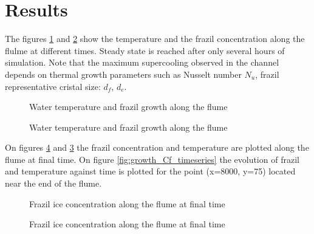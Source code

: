 \section{Results}
The figures \ref{fig:growth_temp} and \ref{fig:growth_Cf} show the temperature and the frazil concentration along the flulme at different times. Steady state is reached after only several hours of simulation. Note that the maximum supercooling observed in the channel depends on thermal growth parameters such as Nusselt number $N_u$, frazil representative cristal size: $d_f$, $d_e$.
\begin{figure}[H]
    \begin{center}
    \end{center}
    \caption{Water temperature and frazil growth along the flume}
    \label{fig:growth_temp}
\end{figure}

\begin{figure}[H]
    \begin{center}
    \end{center}
    \caption{Water temperature and frazil growth along the flume}
    \label{fig:growth_Cf}
\end{figure}

On figures \ref{fig:2d_frazil} and \ref{fig:2d_temperature} the frazil concentration and temperature are plotted along the flume at final time. On figure \ref{fig:growth_Cf_timeseries} the evolution of frazil and temperature against time is plotted for the point 
(x=8000, y=75) located near the end of the flume.

\begin{figure}[H]
    \begin{center}
    \end{center}
    \caption{Frazil ice concentration along the flume at final time}
    \label{fig:2d_temperature}
\end{figure}


\begin{figure}[H]
    \begin{center}
    \end{center}
    \caption{Frazil ice concentration along the flume at final time}
    \label{fig:2d_frazil}
\end{figure}

